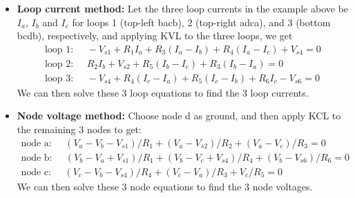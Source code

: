 \begin{itemize}
\begin{comment}
\item {\bf Branch current method:}

  There are $n=4$ nodes (a,b,c,d) and $b=6$ branches in the circuit, 
  therefore we can get $n-1=4-1=3$ independent node equations (first
  three) and $b-(n-1)=6-3=3$ independent loop equations (second three):
  \[ \begin{array}{l}
    \mbox{node a:}\;\;\;\;\; I_1+I_2-I_3=0 	\\
    \mbox{node b:}\;\;\;\;\;-I_1-I_4-I_6=0 	\\
    \mbox{node d:}\;\;\;\;\;-I_2+I_5+I_6=0 	\\
    \mbox{loop 1:}\;\;\;\;\;-V_{s1}+I_1R_1+I_3R_3-I_4R_4+V_{s4}=0 \\
    \mbox{loop 2:}\;\;\;\;\;-I_2R_2+V_{s2}-I_5R_5-I_3R_3=0	 \\
    \mbox{loop 3:}\;\;\;\;\;-V_{s4}+I_4R_4+I_5R_5-I_6R_6-V_{s6}=0 
  \end{array} \]
  Solving these 6 equations we get the 6 branch currents.
\end{comment}

\item {\bf Loop current method:}
  Let the three loop currents in the example above be $I_a$, $I_b$ and $I_c$ 
  for loops 1 (top-left bacb), 2 (top-right adca), and 3 (bottom bcdb),
  respectively, and applying KVL to the three loops, we get
  \[ \begin{array}{l}
    \mbox{loop 1:}\;\;\;\;\;-V_{s1}+R_1I_a+R_3(I_a-I_b)+R_4(I_a-I_c)+V_{s4}=0 \\
    \mbox{loop 2:}\;\;\;\;\;R_2I_b+V_{s2}+R_5(I_b-I_c)+R_3(I_b-I_a)=0 \\
    \mbox{loop 3:}\;\;\;\;\;-V_{s4}+R_4(I_c-I_a)+R_5(I_c-I_b)+R_6I_c-V_{s6}=0 
  \end{array} \]
  We can then solve these 3 loop equations to find the 3 loop currents.

\item {\bf Node voltage method:}
  Choose node d as ground, and then apply KCL to the remaining 3 nodes to get:
  \[ \begin{array}{l}
    \mbox{node a:}\;\;\;\;\;(V_a-V_b-V_{s1})/R_1+(V_a-V_{s2})/R_2+(V_a-V_c)/R_3=0 \\
    \mbox{node b:}\;\;\;\;\;(V_b-V_a+V_{s1})/R_1+(V_b-V_c+V_{s4})/R_4+(V_b-V_{s6})/R_6=0 \\
    \mbox{node c:}\;\;\;\;\;(V_c-V_b-V_{s4})/R_4+(V_c-V_a)/R_3+V_c/R_5=0 
  \end{array} \]
  We can then solve these 3 node equations to find the 3 node voltages.

\end{itemize}

